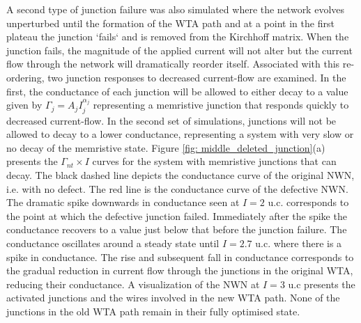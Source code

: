 A second type of junction failure was also simulated where the network evolves unperturbed until the formation of the WTA path and at a point in the first plateau the junction `fails` and is removed from the Kirchhoff matrix. When the junction fails, the magnitude of the applied current will not alter but the current flow through the network will dramatically reorder itself. Associated with this re-ordering, two junction responses to decreased current-flow are examined. In the first, the conductance of each junction will be allowed to either decay to a value given by $\Gamma_{j} = A_j I_j^{\alpha_j}$ representing a memristive junction that responds quickly to decreased current-flow. In the second set of simulations, junctions will not be allowed to decay to a lower conductance, representing a system with very slow or no decay of the memristive state. Figure \ref{fig: middle_deleted_junction}(a) presents the $\Gamma_{nt} \times I$ curves for the system with memristive junctions that can decay. The black dashed line depicts the conductance curve of the original NWN, i.e. with no defect. The red line is the conductance curve of the defective NWN. The dramatic spike downwards in conductance seen at $I = 2$ u.c. corresponds to the point at which the defective junction failed. Immediately after the spike the conductance recovers to a value just below that before the junction failure. The conductance oscillates around a steady state until $ I = 2.7$ u.c. where there is a spike in conductance. The rise and subsequent fall in conductance corresponds to the gradual reduction in current flow through the junctions in the original WTA, reducing their conductance. A visualization of the NWN at $ I = 3$ u.c presents the activated junctions and the wires involved in the new WTA path. None of the junctions in the old WTA path remain in their fully optimised state. 

